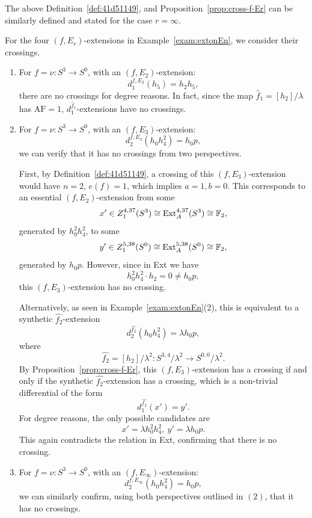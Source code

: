 \documentclass{amsart}
\numberwithin{equation}{section}
\newcommand{\AF}{\mathrm{AF}}
\begin{document}
The above Definition~\ref{def:41d51149}, and Proposition~\ref{prop:cross-f-Er} can be similarly defined and stated for the case $r=\infty$.  

\begin{example} \label{exam:Ercross}
    For the four $(f,E_r)$-extensions in Example~\ref{exam:extonEn}, we consider their crossings.
    \begin{enumerate}
        \item For $f = \nu: S^3 \rightarrow S^0$, with an $(f, E_2)$-extension:
        $$d_1^{f, E_2} (h_5) = h_2 h_5,$$
        there are no crossings for degree reasons. In fact, since the map $\hat{f}_1 = [h_2]/\lambda$ has $\AF=1$, $d_1^{\hat{f}_1}$-extensions have no crossings.

        \item For $f = \nu: S^3 \rightarrow S^0$, with an $(f, E_3)$-extension:
        $$d_2^{f, E_3} (h_0h_4^2) = h_0 p,$$
        we can verify that it has no crossings from two perspectives.
        
        First, by Definition~\ref{def:41d51149}, a crossing of this $(f, E_3)$-extension would have $n=2$, $e(f)=1$, which implies $a=1, b=0$. This corresponds to an essential $(f, E_2)$-extension from some 
        $$x' \in Z_1^{4,37}(S^3) \cong \mathrm{Ext}_A^{4, 37}(S^3) \cong \mathbb{F}_2,$$
        generated by $h_0^2h_4^2$, to some 
        $$y' \in Z_1^{5,38}(S^0) \cong \mathrm{Ext}_A^{5, 38}(S^0) \cong \mathbb{F}_2,$$
        generated by $h_0p$. However, since in Ext we have
        $$h_0^2 h_4^2 \cdot h_2 = 0 \neq h_0 p,$$
        this $(f, E_3)$-extension has no crossing.

        Alternatively, as seen in Example~\ref{exam:extonEn}(2), this is equivalent to a synthetic $\hat{f_{2}}$-extension
        $$d_2^{\hat{f_{2}}} (h_0h_4^2) = \lambda h_0 p,$$
        where 
        $$\hat{f_{2}} = [h_2]/\lambda^2: S^{3,4}/\lambda^2 \rightarrow S^{0,0}/\lambda^2.$$
        By Proposition~\ref{prop:cross-f-Er}, this $(f, E_3)$-extension has a crossing if and only if the synthetic $\hat{f_{2}}$-extension has a crossing, which is a non-trivial differential of the form
        $$d_1^{\hat{f_{2}}} (x') = y'.$$
        For degree reasons, the only possible candidates are $$x'= \lambda h_0^2 h_4^2, \ y' = \lambda h_0 p.$$ This again contradicts the relation in Ext, confirming that there is no crossing.

        \item For $f = \nu: S^3 \rightarrow S^0$, with an $(f, E_\infty)$-extension:
        $$d_2^{f, E_\infty} (h_0h_4^2) = h_0 p,$$
        we can similarly confirm, using both perspectives outlined in $(2)$, that it has no crossings.


\end{enumerate}
\end{example}
\end{document}
